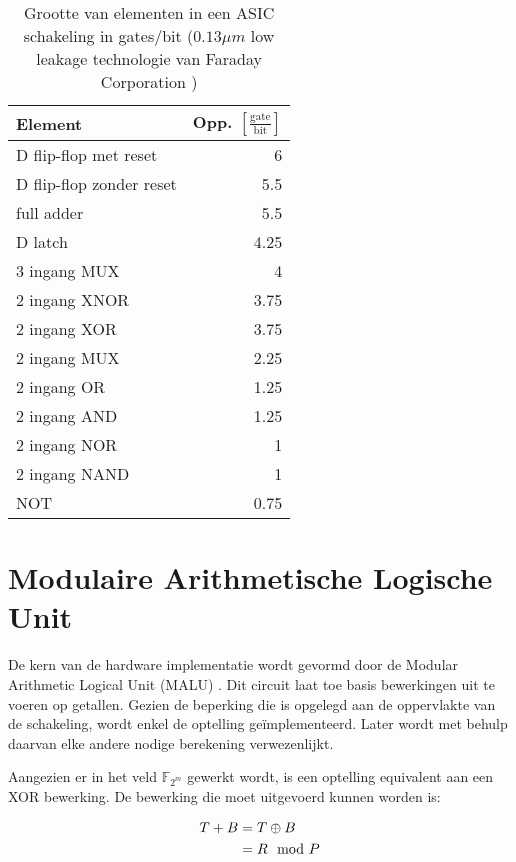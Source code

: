 \begin{table}[h]
	\caption[Oppervlakte van elementen in een ASIC schakeling in gates$/$bit ($0.13 \mu m$ \emph{low leakage} technologie van Faraday Technology Corporation)]{Grootte van elementen in een ASIC schakeling in gates$/$bit ($0.13 \mu m$ low leakage technologie van Faraday Corporation \cite{cell-databook})}
	\label{tabel-implementatie-beperkingen-elementen-gatecount}

	\centering
	\begin{tabular}{lr}
		\toprule
		Element			& Opp. $\left[\frac{\text{gate}}{\text{bit}}\right]$\\
		\midrule
		D flip-flop met reset	& 6\\
		D flip-flop zonder reset	& 5.5\\
		full adder		& 5.5\\
		D latch			& 4.25\\
		3 ingang MUX	& 4\\
		2 ingang XNOR	& 3.75\\
		2 ingang XOR	& 3.75\\
		2 ingang MUX	& 2.25\\
		2 ingang OR		& 1.25\\
		2 ingang AND	& 1.25\\
		2 ingang NOR	& 1\\
		2 ingang NAND	& 1\\
		NOT				& 0.75\\
		\bottomrule		
	\end{tabular}
\end{table}

\section{Modulaire Arithmetische Logische Unit\label{sectie-implementatie-malu}}

De kern van de hardware implementatie wordt gevormd door de Modular Arithmetic Logical Unit (MALU) \cite{sakiyama, batina-lowcost}. Dit circuit laat toe basis bewerkingen uit te voeren op getallen. Gezien de beperking die is opgelegd aan de oppervlakte van de schakeling, wordt enkel de optelling ge\"implementeerd. Later wordt met behulp daarvan elke andere nodige berekening verwezenlijkt.

Aangezien er in het veld $\mathbb{F}_{2^m}$ gewerkt wordt, is een optelling equivalent aan een XOR bewerking. De bewerking die moet uitgevoerd kunnen worden is:

\[\begin{aligned}
T + B	&= T \oplus B\\
		&= R \mod P
\end{aligned}\]

